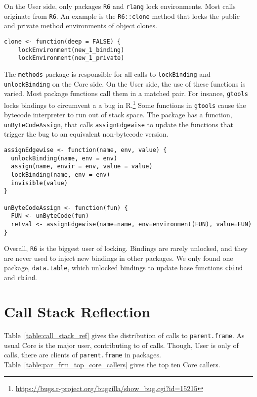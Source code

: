 \documentclass[10pt,sigplan,authorversion=true]{acmart}
\renewcommand{\c}[1]{\lstinline |#1|\xspace}
\begin{document}
On the {User} side, only packages \c{R6} and \c{rlang} lock environments. Most
calls originate from \c{R6}. An example is the \c{R6::clone} method that locks
the public and private method environments of object clones.

\begin{lstlisting}
clone <- function(deep = FALSE) {
    lockEnvironment(new_1_binding)
    lockEnvironment(new_1_private)
\end{lstlisting}\medskip

The \c{methods} package is responsible for all calls to \c{lockBinding} and
\c{unlockBinding} on the {Core} side. On the {User} side, the use of these
functions is varied. Most package functions call them in a matched pair. For
insance, \c{gtools} locks bindings to circumvent a a bug in
R.\footnote{\url{https://bugs.r-project.org/bugzilla/show_bug.cgi?id=15215}}
Some functions in \c{gtools} cause the bytecode interpreter to run out of stack
space. The package has a function, \c{unByteCodeAssign}, that calls
\c{assignEdgewise} to update the functions that trigger the bug to an equivalent
non-bytecode version.

\begin{lstlisting}
assignEdgewise <- function(name, env, value) {
  unlockBinding(name, env = env)
  assign(name, envir = env, value = value)
  lockBinding(name, env = env)
  invisible(value)
}

unByteCodeAssign <- function(fun) {
  FUN <- unByteCode(fun)
  retval <- assignEdgewise(name=name, env=environment(FUN), value=FUN)
}
\end{lstlisting}\medskip

Overall, \c{R6} is the biggest user of locking. Bindings are rarely unlocked,
and they are never used to inject new bindings in other packages. We only found
one package, \c{data.table}, which unlocked bindings to update base functions
\c{cbind} and \c{rbind}.

\section{Call Stack Reflection}

Table~\ref{table:call_stack_ref} gives the distribution of calls to
\c{parent.frame}. As usual {Core} is the major user, contributing to
\ParentFrameCoreCallPerc of calls. Though, {User} is only
\ParentFrameUserCallPerc of calls, there are \ParentFrameUserFunCnt clients of
\c{parent.frame} in \ParentFrameUserPackCnt packages.
Table~\ref{table:par_frm_top_core_callers} gives the top ten {Core} callers.
\end{document}
